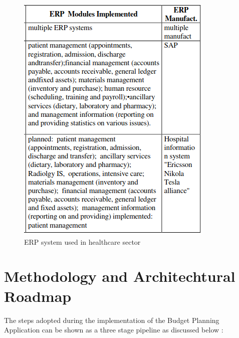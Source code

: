 \begin{figure}[H]
    \centering
        \includegraphics[scale=0.5]{Chapter1/Figures/ERP4.png}	
        \caption{ERP system used in healthcare sector }
        \label{fig:ERPHealthcare}
    \end{figure}
    

    \section[Methodology and Architechtural Roadmap]{\textbf{Methodology and Architechtural Roadmap}}
    The steps adopted during the implementation of the Budget Planning Application can
    be shown as a three stage pipeline as discussed below :
    

